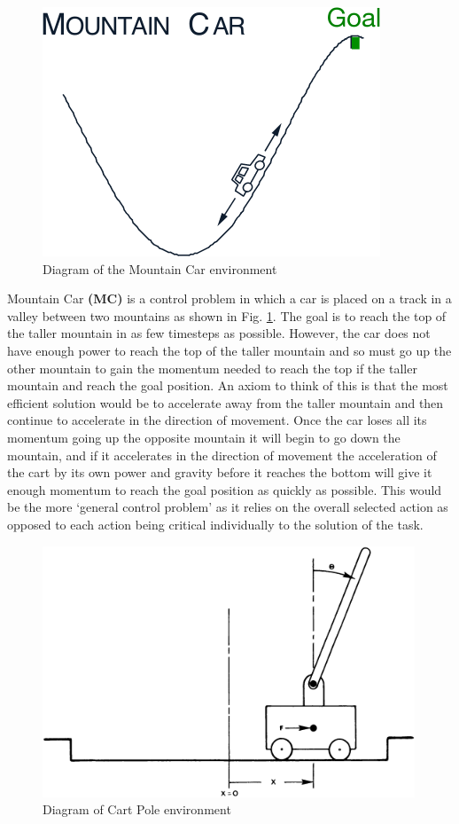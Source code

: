 \documentclass[hidelinks,journal]{IEEEtran}
\begin{document}
\begin{figure}[!h]
  \centering
  \includegraphics[scale=0.5]{img/mountainCar.png}
  \caption{Diagram of the Mountain Car environment \parencite[Figure 10.1,p 199]{Sutton18}}
  \label{fig:mountainCar}
\end{figure}

Mountain Car \textbf{(MC)} is a control problem in which a car is placed on a track in a valley between two mountains as shown in Fig. \ref{fig:mountainCar}. The goal is to reach the top of the taller mountain in as few timesteps as possible. However, the car does not have enough power to reach the top of the taller mountain and so must go up the other mountain to gain the momentum needed to reach the top if the taller mountain and reach the goal position. An axiom to think of this is that the most efficient solution would be to accelerate away from the taller mountain and then continue to accelerate in the direction of movement. Once the car loses all its momentum going up the opposite mountain it will begin to go down the mountain, and if it accelerates in the direction of movement the acceleration of the cart by its own power and gravity before it reaches the bottom will give it enough momentum to reach the goal position as quickly as possible. This would be the more ‘general control problem’ as it relies on the overall selected action as opposed to each action being critical individually to the solution of the task.

\begin{figure}[!h]
  \centering
  \includegraphics[scale=0.5]{img/cartPole.png}
  \caption{Diagram of Cart Pole environment \parencite[Fig. 1,p 838]{Barto83}}
  \label{fig:cartPole}
\end{figure}
\end{document}
